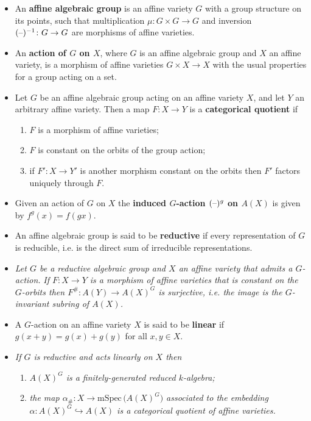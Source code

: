 \documentclass[10pt]{article}
\newcommand{\blank}{\hbox{--}}
\begin{document}
            \begin{itemize}
                \item An \textbf{affine algebraic group} is an affine variety $G$ with a group structure on its points, such that multiplication $\mu\colon G\times G\to G$ and inversion $(\blank)^{-1}\colon G\to G$ are morphisms of affine varieties.
                \item An \textbf{action of $G$ on $X$}, where $G$ is an affine algebraic group and $X$ an affine variety, is a morphism of affine varieties $G\times X\to X$ with the usual properties for a group acting on a set.
                \item Let $G$ be an affine algebraic group acting on an affine variety $X$, and let $Y$ an arbitrary affine variety.
                    Then a map $F\colon X\to Y$ is a \textbf{categorical quotient} if
                    \begin{enumerate}
                        \item $F$ is a morphism of affine varieties;
                        \item $F$ is constant on the orbits of the group action;
                        \item if $F'\colon X\to Y'$ is another morphism constant on the orbits then $F'$ factors uniquely through $F$.
                    \end{enumerate}
                \item Given an action of $G$ on $X$ the \textbf{induced $G$-action $(\blank)^g$ on $A(X)$} is given by \mbox{$f^g(x)=f(gx)$}.
                \item An affine algebraic group is said to be \textbf{reductive} if every representation of $G$ is reducible, i.e. is the direct sum of irreducible representations.
                \item \emph{Let $G$ be a reductive algebraic group and $X$ an affine variety that admits a $G$-action.}
                    \emph{If $F\colon X\to Y$ is a morphism of affine varieties that is constant on the $G$-orbits then $F^\#\colon A(Y)\to A(X)^G$ is surjective, i.e. the image is the $G$-invariant subring of $A(X)$.}
                \item A $G$-action on an affine variety $X$ is said to be \textbf{linear} if $g(x+y)=g(x)+g(y)$ for all $x,y\in X$.
                \item \emph{If $G$ is reductive and acts linearly on $X$ then}
                    \begin{enumerate}
                        \item \emph{$A(X)^G$ is a finitely-generated reduced $k$-algebra;}
                        \item \emph{the map $\alpha_\#\colon X\to\mathrm{mSpec}\,\big(A(X)^G\big)$ associated to the embedding $\alpha\colon A(X)^G\hookrightarrow A(X)$ is a categorical quotient of affine varieties.}
                    \end{enumerate}


\end{itemize}
\end{document}
